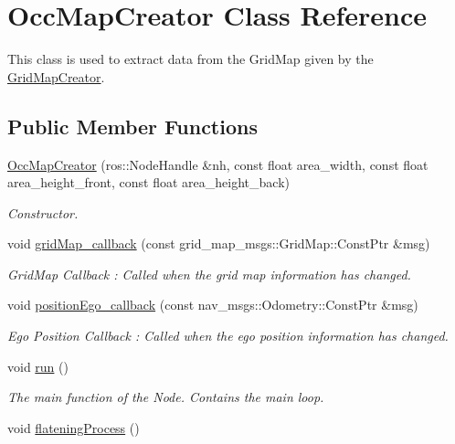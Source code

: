 \hypertarget{classOccMapCreator}{}\section{Occ\+Map\+Creator Class Reference}
\label{classOccMapCreator}


This class is used to extract data from the Grid\+Map given by the \hyperlink{classGridMapCreator}{Grid\+Map\+Creator}.  


\subsection*{Public Member Functions}
\begin{DoxyCompactItemize}
\item 
\hyperlink{classOccMapCreator_a067844320d21de45f00cb997480a6088}{Occ\+Map\+Creator} (ros\+::\+Node\+Handle \&nh, const float area\+\_\+width, const float area\+\_\+height\+\_\+front, const float area\+\_\+height\+\_\+back)
\begin{DoxyCompactList}\small\item\em Constructor. \end{DoxyCompactList}\item 
void \hyperlink{classOccMapCreator_a06458176cc3d8e294d43d997d0aeec5c}{grid\+Map\+\_\+callback} (const grid\+\_\+map\+\_\+msgs\+::\+Grid\+Map\+::\+Const\+Ptr \&msg)
\begin{DoxyCompactList}\small\item\em Grid\+Map Callback \+: Called when the grid map information has changed. \end{DoxyCompactList}\item 
void \hyperlink{classOccMapCreator_afa7b05bd0cb89c52bafdc466203614f4}{position\+Ego\+\_\+callback} (const nav\+\_\+msgs\+::\+Odometry\+::\+Const\+Ptr \&msg)
\begin{DoxyCompactList}\small\item\em Ego Position Callback \+: Called when the ego position information has changed. \end{DoxyCompactList}\item 
void \hyperlink{classOccMapCreator_a83a46376242add139350a6d1a21f1a5f}{run} ()
\begin{DoxyCompactList}\small\item\em The main function of the Node. Contains the main loop. \end{DoxyCompactList}\item 
void \hyperlink{classOccMapCreator_abe47c0065aaebc9269c5f88c67606afe}{flatening\+Process} ()

\end{DoxyCompactItemize}
